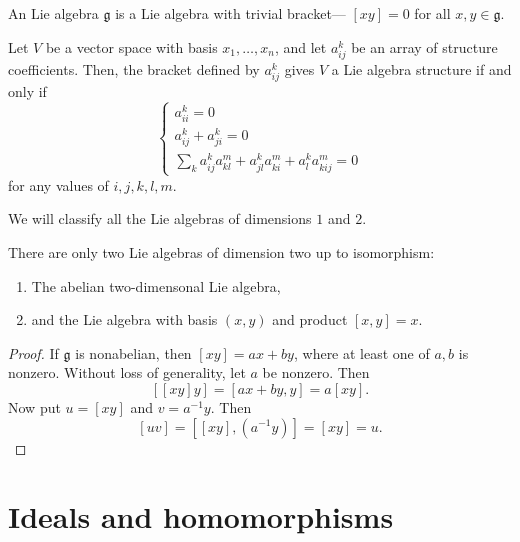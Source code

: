 \documentclass{article}
\newcommand{\lb}[1]{\ensuremath{\left[{#1}\right]}}
\newcommand{\frkg}{{\ensuremath{\mathfrak{g}}}}
\begin{document}
\begin{definition}
    An  Lie algebra $\frkg$ is a Lie algebra with trivial bracket--- $\lb{xy} = 0$ for all $x,y \in \frkg$.
\end{definition}

\begin{proposition}
    Let $V$ be a vector space with basis $x_1,\ldots,x_n$, and let $a_{ij}^k$ be an array of structure coefficients.
    Then, the bracket defined by $a_{ij}^k$ gives $V$ a Lie algebra structure if and only if
    \[
        \begin{cases}
            a_{ii}^k = 0 \\
            a_{ij}^k + a_{ji}^k = 0 \\
            \sum_k
            a_{ij}^ka_{kl}^m
            + a_{jl}^ka_{ki}^m
            + a_{l}^ka_{kij}^m
            =
            0
        \end{cases}
    \]
    for any values of $i,j,k,l,m$.
\end{proposition}

We will classify all the Lie algebras of dimensions $1$ and $2$.

\begin{proposition}
    There are only two Lie algebras of dimension two up to isomorphism:
    \begin{enumerate}[label=(\alph*)]
        \item 
            The abelian two-dimensonal Lie algebra,
        \item 
            and the Lie algebra with basis $(x,y)$ and product $[x,y] = x$.
    \end{enumerate}
\end{proposition}

\begin{proof}
    If $\frkg$ is nonabelian, then $\lb{xy} = ax + by$, where at least one of $a, b$ is nonzero.
    Without loss of generality, let $a$ be nonzero.
    Then
    \[
        \lb{\lb{xy}y}
        =
        \lb{ax + by,y}
        =
        a\lb{xy}.
    \]
    Now put $u = \lb{xy}$ and $v = a^{-1}y$.
    Then
    \[
        \lb{uv}
        =
        \lb{\lb{xy},(a^{-1}y)}
        =
        \lb{xy}
        =
        u.
    \]
\end{proof}

\section{Ideals and homomorphisms}
\end{document}
